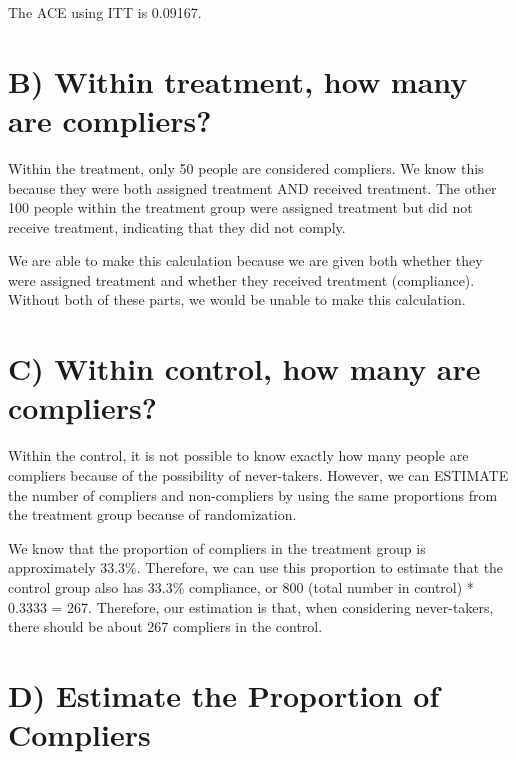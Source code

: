 \documentclass[
]{article}
\begin{document}
The ACE using ITT is 0.09167.

\hypertarget{b-within-treatment-how-many-are-compliers}{%
\section{B) Within treatment, how many are
compliers?}\label{b-within-treatment-how-many-are-compliers}}

Within the treatment, only 50 people are considered compliers. We know
this because they were both assigned treatment AND received treatment.
The other 100 people within the treatment group were assigned treatment
but did not receive treatment, indicating that they did not comply.

We are able to make this calculation because we are given both whether
they were assigned treatment and whether they received treatment
(compliance). Without both of these parts, we would be unable to make
this calculation.

\hypertarget{c-within-control-how-many-are-compliers}{%
\section{C) Within control, how many are
compliers?}\label{c-within-control-how-many-are-compliers}}

Within the control, it is not possible to know exactly how many people
are compliers because of the possibility of never-takers. However, we
can ESTIMATE the number of compliers and non-compliers by using the same
proportions from the treatment group because of randomization.

We know that the proportion of compliers in the treatment group is
approximately 33.3\%. Therefore, we can use this proportion to estimate
that the control group also has 33.3\% compliance, or 800 (total number
in control) * 0.3333 = 267. Therefore, our estimation is that, when
considering never-takers, there should be about 267 compliers in the
control.

\hypertarget{d-estimate-the-proportion-of-compliers}{%
\section{D) Estimate the Proportion of
Compliers}\label{d-estimate-the-proportion-of-compliers}}
\end{document}

